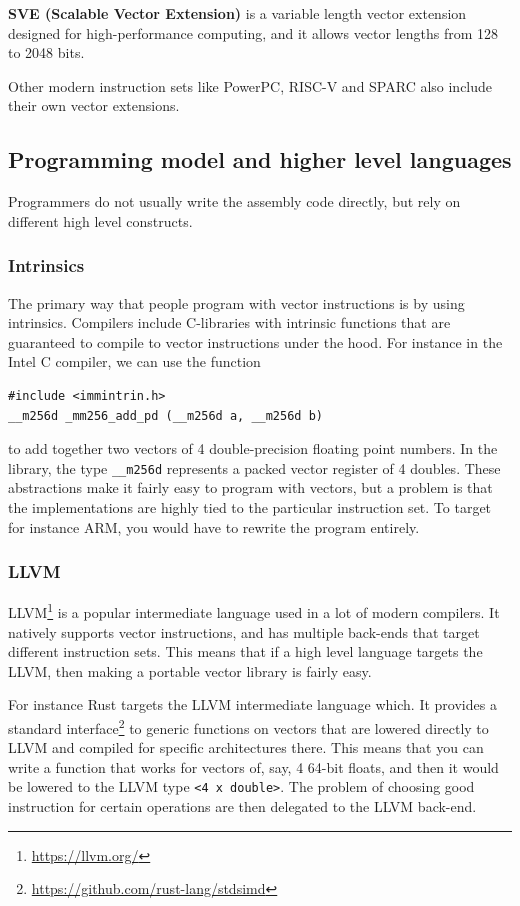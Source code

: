 \documentclass{article}
\begin{document}
\textbf{SVE (Scalable Vector Extension)}
is a variable length vector extension designed for high-performance computing, and it allows vector lengths from 128 to 2048 bits.

Other modern instruction sets like PowerPC, RISC-V and SPARC also include their own vector extensions.

\subsection{Programming model and higher level languages}
Programmers do not usually write the assembly code directly, but rely on different high level constructs.

\subsubsection{Intrinsics}

The primary way that people program with vector instructions is by using intrinsics. Compilers include C-libraries with intrinsic functions that are guaranteed to compile to vector instructions under the hood. For instance in the Intel C compiler, we can use the function
\begin{verbatim}
#include <immintrin.h>
__m256d _mm256_add_pd (__m256d a, __m256d b)
\end{verbatim}
to add together two vectors of 4 double-precision floating point numbers. In the library, the type \verb!__m256d! represents a packed vector register of 4 doubles. These abstractions make it fairly easy to program with vectors, but a problem is that the implementations are highly tied to the particular instruction set. To target for instance ARM, you would have to rewrite the program entirely.

\subsubsection{LLVM}

LLVM\footnote{\url{https://llvm.org/}} is a popular intermediate language used in a lot of modern compilers. It natively supports vector instructions, and has multiple back-ends that target different instruction sets. This means that if a high level language targets the LLVM, then making a portable vector library is fairly easy.

For instance Rust targets the LLVM intermediate language which. It provides a standard interface\footnote{\url{https://github.com/rust-lang/stdsimd}} to generic functions on vectors that are lowered directly to LLVM and compiled for specific architectures there. This means that you can write a function that works for vectors of, say, 4 64-bit floats, and then it would be lowered to the LLVM type \verb!<4 x double>!. The problem of choosing good instruction for certain operations are then delegated to the LLVM back-end.
\end{document}
